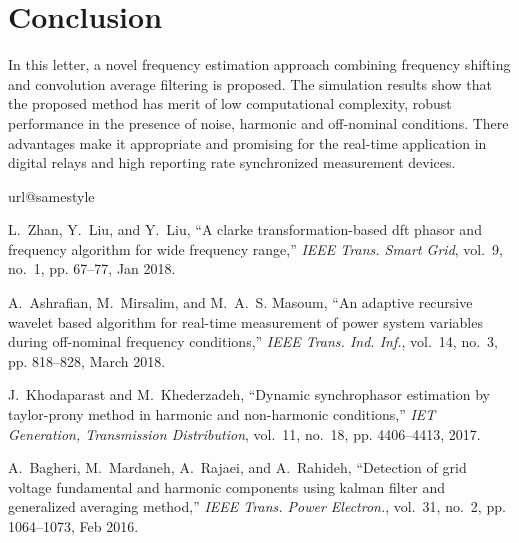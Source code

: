 \documentclass[journal,twoside]{IEEEtran}
\begin{document}
\section{Conclusion}
In this letter, a novel  frequency estimation approach combining frequency shifting and convolution average filtering is proposed. The simulation results show that the proposed method has merit of low computational complexity, robust performance in the presence of noise, harmonic and off-nominal conditions. There advantages make it appropriate and promising for the real-time application in digital relays and  high reporting rate synchronized measurement devices.

%
\begin{thebibliography}{10}
	\providecommand{\url}[1]{#1}
	\csname url@samestyle\endcsname
	\providecommand{\newblock}{\relax}
	\providecommand{\bibinfo}[2]{#2}
	\providecommand{\BIBentrySTDinterwordspacing}{\spaceskip=0pt\relax}
	\providecommand{\BIBentryALTinterwordstretchfactor}{4}
	\providecommand{\BIBentryALTinterwordspacing}{\spaceskip=\fontdimen2\font plus
		\BIBentryALTinterwordstretchfactor\fontdimen3\font minus
		\fontdimen4\font\relax}
	\providecommand{\BIBforeignlanguage}[2]{{%
			\expandafter\ifx\csname l@#1\endcsname\relax
			\typeout{** WARNING: IEEEtran.bst: No hyphenation pattern has been}%
			\typeout{** loaded for the language `#1'. Using the pattern for}%
			\typeout{** the default language instead.}%
			\else
			\language=\csname l@#1\endcsname
			\fi
			#2}}
	\providecommand{\BIBdecl}{\relax}
	\BIBdecl
	
	L.~Zhan, Y.~Liu, and Y.~Liu, ``A clarke transformation-based dft phasor and
	frequency algorithm for wide frequency range,'' \emph{IEEE Trans. Smart
		Grid}, vol.~9, no.~1, pp. 67--77, Jan 2018.
	
	A.~Ashrafian, M.~Mirsalim, and M.~A.~S. Masoum, ``An adaptive recursive wavelet
	based algorithm for real-time measurement of power system variables during
	off-nominal frequency conditions,'' \emph{IEEE Trans. Ind. Inf.}, vol.~14,
	no.~3, pp. 818--828, March 2018.
	
	J.~Khodaparast and M.~Khederzadeh, ``Dynamic synchrophasor estimation by
	taylor-prony method in harmonic and non-harmonic conditions,'' \emph{IET
		Generation, Transmission Distribution}, vol.~11, no.~18, pp. 4406--4413,
	2017.
	
	A.~Bagheri, M.~Mardaneh, A.~Rajaei, and A.~Rahideh, ``Detection of grid voltage
	fundamental and harmonic components using kalman filter and generalized
	averaging method,'' \emph{IEEE Trans. Power Electron.}, vol.~31, no.~2, pp.
	1064--1073, Feb 2016.
	

\end{thebibliography}
\end{document}
